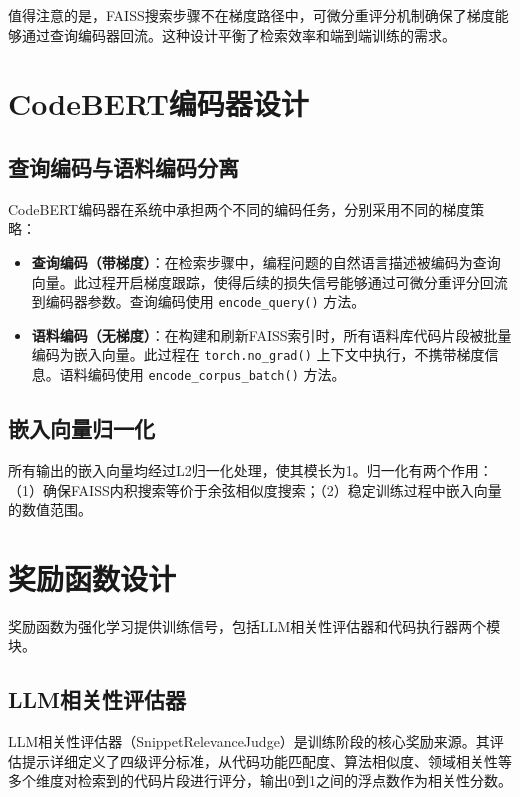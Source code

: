 \documentclass[
    fontset = win, %
  ]{njuthesis}
\begin{document}
值得注意的是，FAISS搜索步骤不在梯度路径中，可微分重评分机制确保了梯度能够通过查询编码器回流。这种设计平衡了检索效率和端到端训练的需求。

\section{CodeBERT编码器设计}

\subsection{查询编码与语料编码分离}

CodeBERT编码器在系统中承担两个不同的编码任务，分别采用不同的梯度策略：

\begin{itemize}
    \item \textbf{查询编码（带梯度）}：在检索步骤中，编程问题的自然语言描述被编码为查询向量。此过程开启梯度跟踪，使得后续的损失信号能够通过可微分重评分回流到编码器参数。查询编码使用 \texttt{encode\_query()} 方法。
    \item \textbf{语料编码（无梯度）}：在构建和刷新FAISS索引时，所有语料库代码片段被批量编码为嵌入向量。此过程在 \texttt{torch.no\_grad()} 上下文中执行，不携带梯度信息。语料编码使用 \texttt{encode\_corpus\_batch()} 方法。
\end{itemize}

\subsection{嵌入向量归一化}

所有输出的嵌入向量均经过L2归一化处理，使其模长为1。归一化有两个作用：（1）确保FAISS内积搜索等价于余弦相似度搜索；（2）稳定训练过程中嵌入向量的数值范围。

\section{奖励函数设计}

奖励函数为强化学习提供训练信号，包括LLM相关性评估器和代码执行器两个模块。

\subsection{LLM相关性评估器}

LLM相关性评估器（SnippetRelevanceJudge）是训练阶段的核心奖励来源。其评估提示详细定义了四级评分标准，从代码功能匹配度、算法相似度、领域相关性等多个维度对检索到的代码片段进行评分，输出0到1之间的浮点数作为相关性分数。
\end{document}
